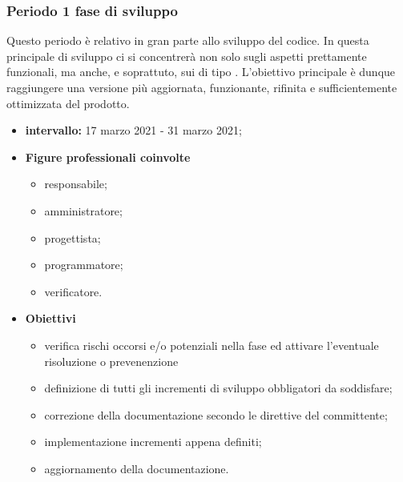 

        \subsubsection{Periodo 1 fase di sviluppo}
        Questo periodo è relativo in gran parte allo sviluppo del codice. In questa  principale di sviluppo ci si concentrerà non solo sugli aspetti prettamente funzionali, ma anche, e soprattuto, sui  di tipo . L'obiettivo principale è dunque raggiungere una versione più aggiornata, funzionante, rifinita e sufficientemente ottimizzata del prodotto.
        \begin{itemize}
                \item \textbf{intervallo: } 17 marzo 2021 - 31 marzo 2021;
                \item  \textbf{Figure professionali coinvolte}
                \begin{itemize}
                    \item responsabile;
                    \item amministratore;
                    \item progettista;
                    \item programmatore;
                    \item verificatore.
                \end{itemize}
                \item \textbf{Obiettivi}
                \begin{itemize}
                    \item verifica rischi occorsi e/o potenziali nella fase ed attivare l'eventuale risoluzione o prevenenzione
                    \item definizione di tutti gli incrementi di sviluppo obbligatori da soddisfare;
                    \item correzione della documentazione secondo le direttive del committente;
                    \item implementazione incrementi appena definiti;
                    \item aggiornamento della documentazione.
                \end{itemize}
        \end{itemize}

